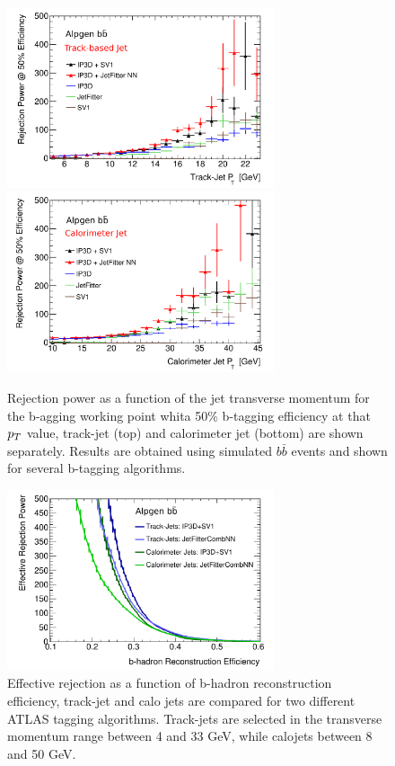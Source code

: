 \begin{figure}[!tp]
\centering
\includegraphics[width=0.7\textwidth]{figure/trackjet/std_rej_pt2.pdf}
\includegraphics[width=0.7\textwidth]{figure/trackjet/std_cal_rej_pt2.pdf}
\caption{Rejection power as a function of the jet transverse momentum for the b-agging 
	working point whita  50\% b-tagging efficiency at that $p_{T}$ value, track-jet (top) and calorimeter jet (bottom) are
	shown separately. Results are obtained using simulated $b\bar{b}$ events
	and shown for several b-tagging algorithms.}
\label{fig:rej_pt}
\end{figure}    

\begin{figure}[!tp]
\centering
\includegraphics[width=0.7\textwidth]{figure/trackjet/eff_real_rej_mod2.pdf}
\caption{Effective rejection as a function of b-hadron reconstruction efficiency, track-jet and calo jets are
	compared for two different ATLAS tagging algorithms. Track-jets are selected in the transverse momentum range 
	between 4 and 33 GeV, while calojets between 8 and 50 GeV.}
\label{fig:cj_tj}
\end{figure}    

